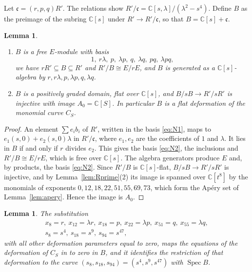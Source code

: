 \documentclass{amsart}
\newtheorem{lemma}[theorem]{Lemma}
\theoremstyle{definition}
\theoremstyle{remark}
\numberwithin{equation}{section}
\newcommand{\C}{\mathbb{C}}
\newcommand{\cc}{\mathfrak{c}}
\DeclareMathOperator{\Spec}{Spec}
\begin{document}
Let $\cc=(r,p,q)R'$. The relations show $R'/\cc=\C[s,\lambda]/(\lambda^2-s^4)$. Define $B$ as the preimage of the subring $\C[s]$ under $R'\to R'/\cc$, so that $B=\C[s]+\cc$.

\begin{lemma}\label{lem:B}
\begin{enumerate}
\item $B$ is a free $E$-module with basis
\begin{equation}\label{eq:N2}
1,\ r\lambda,\ p,\ \lambda p,\ q,\ \lambda q,\ pq,\ \lambda pq,
\end{equation}
we have $rR'\subseteq B\subseteq R'$ and $R'/B\cong E/rE$, and $B$ is generated as a $\C[s]$-algebra by $r,r\lambda,p,\lambda p,q,\lambda q$.
\item $B$ is a positively graded domain, flat over $\C[s]$, and $B/sB\to R'/sR'$ is injective with image $A_0=\C[S]$. In particular $B$ is a flat deformation of the monomial curve $C_S$.
\end{enumerate}
\end{lemma}

\begin{proof}
An element $\sum e_ib_i$ of $R'$, written in the basis \eqref{eq:N1}, maps to $e_1(s,0)+e_2(s,0)\lambda$ in $R'/\cc$, where $e_1,e_2$ are the coefficients of $1$ and $\lambda$. It lies in $B$ if and only if $r$ divides $e_2$. This gives the basis \eqref{eq:N2}, the inclusions and $R'/B\cong E/rE$, which is free over $\C[s]$. The algebra generators produce $E$ and, by products, the basis \eqref{eq:N2}. Since $R'/B$ is $\C[s]$-flat, $B/sB\to R'/sR'$ is injective, and by Lemma~\ref{lem:Rprime}(2) its image is spanned over $\C[t^8]$ by the monomials of exponents $0,12,18,22,51,55,69,73$, which form the Ap\'ery set of Lemma~\ref{lem:apery}. Hence the image is $A_0$.
\end{proof}

\begin{lemma}\label{lem:comparison}
The substitution
\[
\begin{gathered}
x_8=r,\ x_{12}=\lambda r,\ x_{18}=p,\ x_{22}=\lambda p,\ x_{51}=q,\ x_{55}=\lambda q,\\
s_8=s^4,\ s_{18}=s^9,\ s_{94}=s^{47},
\end{gathered}
\]
with all other deformation parameters equal to zero, maps the equations of the deformation of $C_S$ in \cite[Example~2.13]{Ste} to zero in $B$, and it identifies the restriction of that deformation to the curve $(s_8,s_{18},s_{94})=(s^4,s^9,s^{47})$ with $\Spec B$.
\end{lemma}
\end{document}
